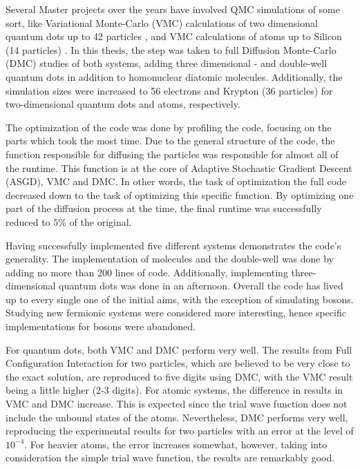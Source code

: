 Several Master projects over the years have involved QMC simulations of some sort, like Variational Monte-Carlo (VMC) calculations of two dimensional quantum dots up to 42 particles \cite{larseivind}, and VMC calculations of atoms up to Silicon (14 particles) \cite{vmcAtoms}. In this thesis, the step was taken to full Diffusion Monte-Carlo (DMC) studies of both systems, adding three dimensional - and double-well quantum dots in addition to homonuclear diatomic molecules. Additionally, the simulation sizes were increased to 56 electrons and Krypton (36 particles) for two-dimensional quantum dots and atoms, respectively.    

The optimization of the code was done by profiling the code, focusing on the parts which took the most time. Due to the general structure of the code, the function responsible for diffusing the particles was responsible for almost all of the runtime. This function is at the core of Adaptive Stochastic Gradient Descent (ASGD), VMC and DMC. In other words, the task of optimization the full code decreased down to the task of optimizing this specific function. By optimizing one part of the diffusion process at the time, the final runtime was successfully reduced to $5\%$ of the original.

Having successfully implemented five different systems demonstrates the code's generality. The implementation of molecules and the double-well was done by adding no more than 200 lines of code. Additionally,  implementing three-dimensional quantum dots was done in an afternoon. Overall the code has lived up to every single one of the initial aims, with the exception of simulating bosons. Studying new fermionic systems were considered more interesting, hence specific implementations for bosons were abandoned.  

For quantum dots, both VMC and DMC perform very well. The results from Full Configuration Interaction \cite{Olsen} for two particles, which are believed to be very close to the exact solution, are reproduced to five digits using DMC, with the VMC result being a little higher (2-3 digits). For atomic systems, the difference in results in VMC and DMC increase. This is expected since the trial wave function does not include the unbound states of the atoms. Nevertheless, DMC performs very well, reproducing the experimental results for two particles with an error at the level of $10^{-4}$. For heavier atoms, the error increases somewhat, however, taking into consideration the simple trial wave function, the results are remarkably good.

